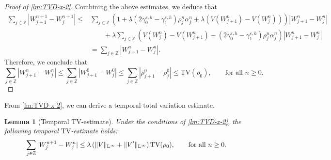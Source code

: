 \documentclass[10pt]{amsart}
\theoremstyle{plain}
\newtheorem{lemma}{Lemma}[section]
\theoremstyle{definition}
\numberwithin{equation}{section}
\newcommand{\eps}{{\varepsilon}}
\begin{document}
\begin{proof}[Proof of \cref{lm:TVD-x-2}]
Combining the above estimates, we deduce that
\begin{align*}
    \sum_{j\in\mathbb{Z}} |W_{j+1}^{n+1} - W_j^{n+1}| \leq& \sum_{j\in\mathbb{Z}}\left( 1 + \lambda \left(2\gamma_0^{\eps,h}-\gamma_1^{\eps,h}\right) \rho_j^n\alpha_j^n + \lambda\left(V(W_{j+1}^n)-V(W_j^n)\right) \right) |W_{j+1}^n - W_j^n| \\
    &\qquad + \lambda \sum_{j\in\mathbb{Z}} \left( V(W_j^n)-V(W_{j+1}^n) - \left(2\gamma_0^{\eps,h}-\gamma_1^{\eps,h}\right)\rho_j^n\alpha_j^n \right) |W_{j+1}^n-W_j^n| \\
   &= \sum_{j\in\mathbb{Z}} |W_{j+1}^n-W_j^n| .
\end{align*}
Therefore, we conclude that 
\[
\sum_{j\in\mathbb{Z}} |W_{j+1}^{n} - W_j^{n}| \leq \sum_{j\in\mathbb{Z}} |W_{j+1}^0-W_j^0| \leq \sum_{j \in \mathbb Z} |\rho^0_{j+1} - \rho^0_j| \leq \mathrm{TV}(\rho_0), \qquad \text{for all $n\ge0$.}
\]

\end{proof}

From \cref{lm:TVD-x-2}, we can derive a temporal total variation estimate. 

\begin{lemma}[Temporal TV-estimate]\label{lm:TVD-t-general}
Under the conditions of \cref{lm:TVD-x-2},  the following temporal $\mathrm{TV}$-estimate holds:  
\begin{align}\label{eq:TVD-t-general}
    \sum_{j\in\mathbb{Z}} |W_j^{n+1}-W_j^n| \leq \lambda \left(\|V\|_{\mathrm{L}^{\infty}} + \|V'\|_{\mathrm{L}^{\infty}}\right) \mathrm{TV}(\rho_0), \qquad \textnormal{for all $n\ge0$.}
\end{align}
\end{lemma}
\end{document}
